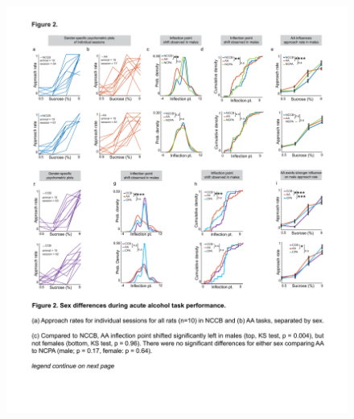 \documentclass{article}
\begin{document}
\begin{figure}
  \centering
  \includegraphics[width=\textwidth, trim=50 100 50 100]{Figs/Alcohol_main_2.pdf}
\end{figure}

\clearpage

\captionsetup{type=figure}  %
\caption{\textbf{Sex differences during acute alcohol task performance.} (a) Approach rates for individual sessions for all rats (n=10) in NCCB and (b) AA tasks, separated by sex. (c) Compared to NCCB, AA inflection point shifted significantly left in males (top, KS test, p = 0.004), but not females (bottom, KS test, p = 0.96). (d) There were no significant differences for either sex comparing AA to NCPA (male; p = 0.17, female: p = 0.64). Cumulative density function plots of the distributions in (c). (e) Approach rate is significantly different between NCCB and AA for males (MANOVA, p $<$ 0.0001, top) but not females (MANOVA, p = 0.47, bottom). (f) Approach rates of individual sessions for rats split by sex (n = 10 males, n = 10 females) in CCB. (g) Compared to CCB, AA inflection point is significantly shifted left in males (KS test, p $<$ 0.0001) but not in females (KS test, p = 0.211) and again there was so significant difference when comparing CCB to CPA in either sex. (h) Inflection point distribution represented as a cumulative density function. (i) In CCB vs AA tasks, approach rate is significantly different in males (MANOVA, p $<$ 0.0001) and females (p = 0.0134) in CCB vs AA tasks with males also having significantly approach rates between CCB and CPA (p = 0.0007) unlike females (p = 0.1).}
\label{fig:alcohol_main_2}
\end{document}
